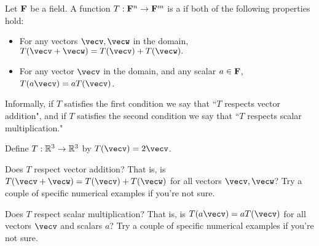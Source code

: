 \endedxvertical








\endedxvertical











Let ${\bf {F}}$ be a field.  A function $T: {\bf {F}}^n \rightarrow {\bf {F}}^m$ is a {}
if both of the following properties hold:

\begin{itemize}
\item For any vectors $\vecv, \vecw$ in the domain, $T(\vecv + \vecw) = T(\vecv) + T(\vecw).$ 
\item For any vector $\vecv$ in the domain, and any scalar $a\in {\bf {F}}$, $T(a\vecv) = aT(\vecv)$.    
\end{itemize}

Informally, if $T$ satisfies the first condition we say that ``$T$ respects vector addition", and 
if $T$ satisfies the second condition we say that ``$T$ respects scalar multiplication."  

\endedxtext

\endedxvertical






Define $T: \mathbb R^3 \rightarrow \mathbb R^3$ by $T(\vecv) = 2\vecv$.  

Does $T$ respect vector addition?  That is, is $T(\vecv + \vecw) = T(\vecv) + T(\vecw)$ for all 
vectors $\vecv,\vecw$?
Try a couple of specific numerical examples if you're not sure.  


Does $T$ respect scalar multiplication?  
That is, is $T(a\vecv) = aT(\vecv)$ for all vectors $\vecv$ and scalars $a$?
Try a couple of specific numerical examples if you're not sure.  



